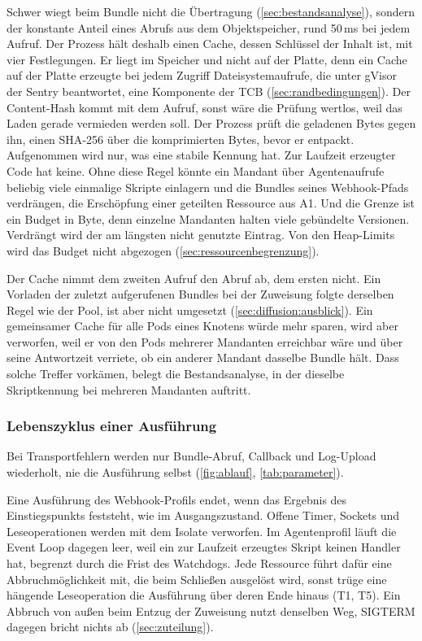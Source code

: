 Schwer wiegt beim Bundle nicht die Übertragung (\autoref{sec:bestandsanalyse}), sondern der konstante Anteil eines Abrufs aus dem Objektspeicher, rund 50\,ms bei jedem Aufruf.
Der Prozess hält deshalb einen Cache, dessen Schlüssel der Inhalt ist, mit vier Festlegungen. Er liegt im Speicher und
nicht auf der Platte, denn ein Cache auf der Platte erzeugte bei jedem Zugriff Dateisystemaufrufe, die unter gVisor
der Sentry beantwortet, eine Komponente der \ac{TCB} (\autoref{sec:randbedingungen}). Der Content-Hash kommt mit dem
Aufruf, sonst wäre die Prüfung wertlos, weil das Laden gerade vermieden werden soll. Der Prozess prüft die
geladenen Bytes gegen ihn, einen \ac{SHA}-256 über die komprimierten Bytes, bevor er entpackt. Aufgenommen wird nur,
was eine stabile Kennung hat. Zur Laufzeit erzeugter Code hat keine. Ohne diese Regel könnte ein Mandant über
Agentenaufrufe beliebig viele einmalige Skripte einlagern und die Bundles seines Webhook-Pfads verdrängen, die
Erschöpfung einer geteilten Ressource aus A1. Und die Grenze ist ein Budget in Byte, denn einzelne Mandanten halten
viele gebündelte Versionen. Verdrängt wird der am längsten nicht genutzte Eintrag. Von den Heap-Limits wird das
Budget nicht abgezogen (\autoref{sec:ressourcenbegrenzung}).

Der Cache nimmt dem zweiten Aufruf den Abruf ab, dem ersten nicht. Ein Vorladen der zuletzt aufgerufenen Bundles bei
der Zuweisung folgte derselben Regel wie der Pool, ist aber nicht umgesetzt (\autoref{sec:diffusion:ausblick}). Ein
gemeinsamer Cache für alle Pods eines Knotens würde mehr sparen, wird aber verworfen, weil er von den Pods mehrerer
Mandanten erreichbar wäre und über seine Antwortzeit verriete, ob ein anderer Mandant dasselbe Bundle hält. Dass
solche Treffer vorkämen, belegt die Bestandsanalyse, in der dieselbe Skriptkennung bei mehreren Mandanten auftritt.

\subsubsection{Lebenszyklus einer Ausführung}
\label{sec:lebenszyklus}

Bei Transportfehlern werden nur Bundle-Abruf, Callback und Log-Upload wiederholt, nie die Ausführung selbst
(\autoref{fig:ablauf}, \autoref{tab:parameter}).

Eine Ausführung des Webhook-Profils endet, wenn das Ergebnis des Einstiegspunkts feststeht, wie im Ausgangszustand.
Offene Timer, Sockets und Leseoperationen werden mit dem Isolate verworfen. Im Agentenprofil läuft die Event Loop
dagegen leer, weil ein zur Laufzeit erzeugtes Skript keinen Handler hat, begrenzt durch die Frist des Watchdogs. Jede
Ressource führt dafür eine Abbruchmöglichkeit mit, die beim Schließen ausgelöst wird, sonst trüge eine hängende
Leseoperation die Ausführung über deren Ende hinaus (T1, T5). Ein Abbruch von außen beim Entzug der Zuweisung nutzt denselben Weg, SIGTERM dagegen bricht nichts ab
(\autoref{sec:zuteilung}).


